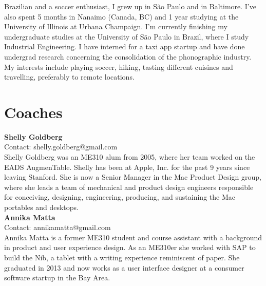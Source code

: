 Brazilian and a soccer enthusiast, I grew up in S\~{a}o Paulo and in Baltimore. I've also spent 5 months in Nanaimo (Canada, BC) and 1 year studying at the University of Illinois at Urbana Champaign. I'm currently finishing my undergraduate studies at the University of S\~{a}o Paulo in Brazil, where I study Industrial Engineering. I have interned for a taxi app startup and have done undergrad research concerning the consolidation of the phonographic industry. My interests include playing soccer, hiking, tasting different cuisines and travelling, preferably to remote locations. 
\\

\section{Coaches}

\textbf{Shelly Goldberg} \\
Contact: shelly.goldberg@gmail.com \\ 
Shelly Goldberg was an ME310 alum from 2005, where her team worked on the EADS AugmenTable.  Shelly has been at Apple, Inc. for the past 9 years since leaving Stanford.  She is now a Senior Manager in the Mac Product Design group, where she leads a team of mechanical and product design engineers responsible for conceiving, designing, engineering, producing, and sustaining the Mac portables and desktops.  
\\

\noindent \textbf{Annika Matta} \\
Contact: annikamatta@gmail.com \\
Annika Matta is a former ME310 student and course assistant with a background in product and user experience design. As an ME310er she worked with SAP to build the Nib, a tablet with a writing experience reminiscent of paper. She graduated in 2013 and now works as a user interface designer at a consumer software startup in the Bay Area.
